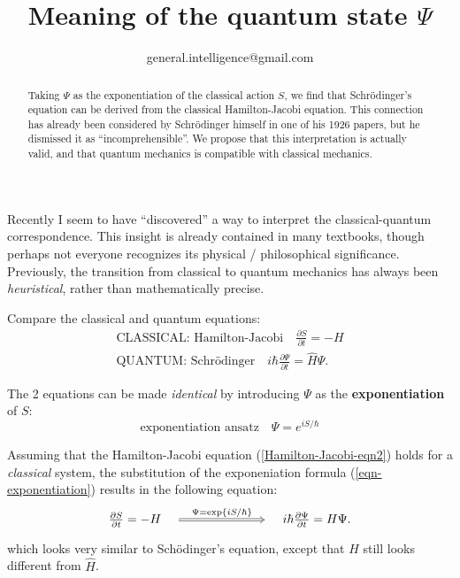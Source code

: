 

\title{Meaning of the quantum state $\Psi$}
\author{ {\footnotesize general.intelligence@gmail.com}}



	\setlength{\parindent}{0pt}
	\setlength{\parskip}{2.8ex plus0.8ex minus0.8ex}
	
	\maketitle
	
\begin{abstract}
	Taking $\Psi$ as the exponentiation of the classical action $S$, we find that Schr\"odinger's equation can be derived from the classical Hamilton-Jacobi equation.  This connection has already been considered by Schr\"odinger himself in one of his 1926 papers, but he dismissed it as ``incomprehensible''.  We propose that this interpretation is actually valid, and that quantum mechanics is compatible with classical mechanics.
\end{abstract}

Recently I seem to have ``discovered'' a way to interpret the classical-quantum correspondence.  This insight is already contained in many textbooks, though perhaps not everyone recognizes its physical / philosophical significance.  Previously, the transition from classical to quantum mechanics has always been \textit{heuristical}, rather than mathematically precise.

Compare the classical and quantum equations:
\begin{eqnarray}
\boxed{\mbox{CLASSICAL: Hamilton-Jacobi}} \quad
\frac{\partial S}{\partial t} = - H
\label{Hamilton-Jacobi-eqn2}
\\
\boxed{\mbox{QUANTUM: Schr\"{o}dinger}} \quad
i \hbar \frac{\partial \Psi}{\partial t} = \hat{H} \Psi .
\label{Schrodinger-eqn}
\end{eqnarray}

The 2 equations can be made \textit{identical} by introducing $\Psi$ as the \textbf{exponentiation} of $S$:
\begin{equation}
\boxed{\mbox{exponentiation ansatz}} \quad
\Psi = e^{i S /\hbar}
\label{eqn-exponentiation}
\end{equation}

Assuming that the Hamilton-Jacobi equation (\ref{Hamilton-Jacobi-eqn2}) holds for a \textit{classical} system, the substitution of the exponeniation formula (\ref{eqn-exponentiation}) results in the following equation:
\begin{equation}
\begin{tikzcd}[column sep = 7em]
\frac{\partial S}{\partial t} = - H \quad
\arrow[Rightarrow, r, "$\Psi = \exp \{ i S / \hbar \} $", align=center]
& \quad i \hbar \frac{\partial \Psi}{\partial t} = H \Psi .
\end{tikzcd}
\end{equation} 
which looks very similar to Sch\"odinger's equation, except that $H$ still looks different from $\hat{H}$.

